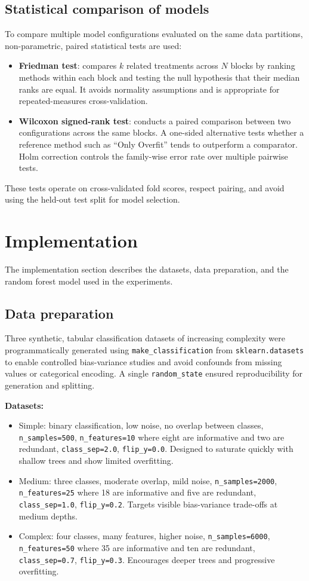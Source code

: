 \documentclass[conference]{IEEEtran}
\begin{document}
\subsection{Statistical comparison of models}
To compare multiple model configurations evaluated on the same data partitions, non-parametric, paired statistical tests are used:
\begin{itemize}
  \item \textbf{Friedman test}: compares $k$ related treatments across $N$ blocks by ranking methods within each block and testing the null hypothesis that their median ranks are equal. It avoids normality assumptions and is appropriate for repeated-measures cross-validation.
  \item \textbf{Wilcoxon signed-rank test}: conducts a paired comparison between two configurations across the same blocks. A one-sided alternative tests whether a reference method such as ``Only Overfit'' tends to outperform a comparator. Holm correction controls the family-wise error rate over multiple pairwise tests.
\end{itemize}
These tests operate on cross-validated fold scores, respect pairing, and avoid using the held-out test split for model selection.


\section{Implementation}
The implementation section describes the datasets, data preparation, and the random forest model used in the experiments.

\subsection{Data preparation}
Three synthetic, tabular classification datasets of increasing complexity were programmatically generated using 
\texttt{make\_classification} from \texttt{sklearn.datasets} \cite{scikit-learn} to enable controlled bias-variance studies and avoid confounds from missing values or categorical encoding. A single \texttt{random\_state} ensured reproducibility for generation and splitting.

\textbf{Datasets:}
\begin{itemize}
  \item Simple: binary classification, low noise, no overlap between classes, \texttt{n\_samples=500}, \texttt{n\_features=10} where eight are informative and two are redundant, \texttt{class\_sep=2.0}, \texttt{flip\_y=0.0}. Designed to saturate quickly with shallow trees and show limited overfitting.
  \item Medium: three classes, moderate overlap, mild noise, \texttt{n\_samples=2000}, \texttt{n\_features=25} where 18 are informative and five are redundant, \texttt{class\_sep=1.0}, \texttt{flip\_y=0.2}. Targets visible bias-variance trade-offs at medium depths.
  \item Complex: four classes, many features, higher noise, \texttt{n\_samples=6000}, \texttt{n\_features=50} where 35 are informative and ten are redundant, \texttt{class\_sep=0.7}, \texttt{flip\_y=0.3}. Encourages deeper trees and progressive overfitting.
\end{itemize}
\end{document}
